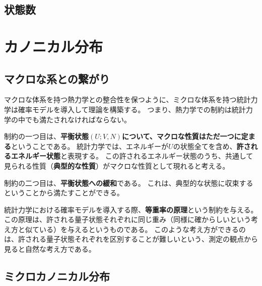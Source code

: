 \documentclass[a4paper]{jsreport}
\begin{document}
        \section{状態数}


    \chapter{カノニカル分布}
        \section{マクロな系との繋がり}
            マクロな体系を持つ熱力学との整合性を保つように、ミクロな体系を持つ統計力学は確率モデルを導入して理論を構築する。
            つまり、熱力学での制約は統計力学の中でも満たされなければならない。\par
            制約の一つ目は、\textbf{平衡状態$(U; V, N)$について、マクロな性質はただ一つに定まる}ということである。
            統計力学では、エネルギーが$U$の状態全てを含め、\textbf{許されるエネルギー状態}と表現する。
            この許されるエネルギー状態のうち、共通して見られる性質（\textbf{典型的な性質}）がマクロな性質として現れると考える。\par
            制約の二つ目は、\textbf{平衡状態への緩和}である。
            これは、典型的な状態に収束するということから満たすことができる。\par
            統計力学における確率モデルを導入する際、\textbf{等重率の原理}という制約を与える。
            この原理は、許される量子状態それぞれに同じ重み（同様に確からしいという考え方と似ている）を与えるというものである。
            このような考え方ができるのは、許される量子状態それぞれを区別することが難しいという、測定の観点から見ると自然な考え方である。\par

        \section{ミクロカノニカル分布}
\end{document}
